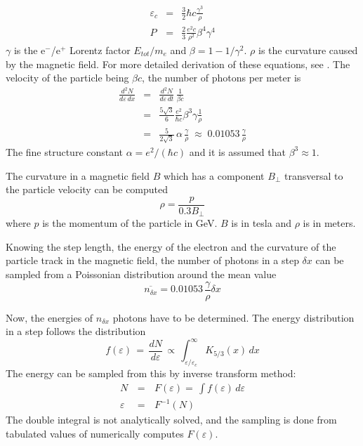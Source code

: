 \begin{eqnarray}
\varepsilon_c & = & \frac{3}{2} \hbar c \frac{\gamma^3}{\rho} \\
P             & = & \frac{2}{3} \frac{ e^2 c}{\rho^2}\beta^4 \gamma^4
\end{eqnarray}
$\gamma$ is the e$^-$/e$^+$ Lorentz factor $E_{tot}/m_e$ and
$\beta = 1 - 1/\gamma^2$. $\rho$ is the
curvature caused by the magnetic field.
For more detailed derivation of these equations,
see \cite{bib-MAIE}.
The velocity of the particle being $\beta c$, the number of
photons per meter is
\begin{eqnarray}
\frac{d^2 \! N}{d\varepsilon \, dx}  & = & 
         \frac{d^2 \! N}{d\varepsilon \, dt} \, \frac{1}{\beta c} \nonumber \\
  & = & \frac{5 \sqrt{3}}{6} \frac{e^2}{\hbar c} 
        \beta^3 \gamma \frac{1}{\rho} \nonumber \\
  & = & \frac{5}{2 \sqrt{3}} \, \alpha \, \frac{\gamma}{\rho} 
        \; \approx  \; 0.01053 \, \frac{\gamma}{\rho}
\end{eqnarray}
The fine structure constant $\alpha = e^2/(\hbar c)$ and it is
assumed that $\beta^3 \approx 1$.

The curvature in a magnetic field $B$ which has a component
$B_{\perp}$ transversal to the particle velocity can
be computed \cite{bib-PDGB}
\begin{equation}
\rho = \frac{p} {0.3 B_{\perp}}
\end{equation} 
where $p$ is the momentum of the particle in GeV. $B$ is in tesla
and $\rho$ is in meters.

Knowing the step length, the energy of the electron
and the curvature of the particle track in the magnetic field,
the number of photons in a step $\delta x$ can be sampled from
a Poissonian distribution around the mean value
\begin{equation}
\overline{n_{\delta x}} = 0.01053 \, \frac{\gamma}{\rho} \delta x
\end{equation}

Now, the energies of $n_{\delta x}$ photons have to be determined.
The energy distribution in a step follows the distribution  \cite{bib-MAIE}
\begin{equation}
f(\varepsilon) \, = \, \frac{dN}{d\varepsilon} \, \propto \, 
        \int_{\varepsilon / \varepsilon_c}^{\infty} K_{5/3}(x) \, dx
\end{equation}
The energy can be sampled from this by inverse transform method:
\begin{eqnarray}
N \, & = & \, F(\varepsilon) = \, \int f(\varepsilon) \, d\varepsilon \\
\varepsilon \, & = & \, F^{-1}(N)
\end{eqnarray}
The double integral is not analytically solved, and the sampling
is done from tabulated values of numerically computes $F(\varepsilon)$. 


